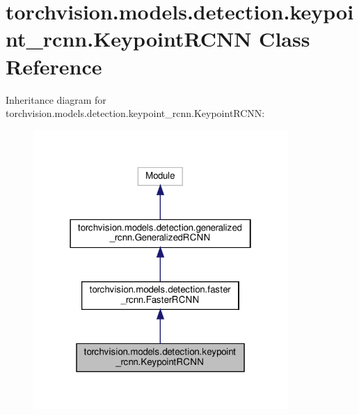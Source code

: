 \hypertarget{classtorchvision_1_1models_1_1detection_1_1keypoint__rcnn_1_1KeypointRCNN}{}\section{torchvision.\+models.\+detection.\+keypoint\+\_\+rcnn.\+Keypoint\+R\+C\+NN Class Reference}
\label{classtorchvision_1_1models_1_1detection_1_1keypoint__rcnn_1_1KeypointRCNN}


Inheritance diagram for torchvision.\+models.\+detection.\+keypoint\+\_\+rcnn.\+Keypoint\+R\+C\+NN\+:
\nopagebreak
\begin{figure}[H]
\begin{center}
\leavevmode
\includegraphics[width=274pt]{classtorchvision_1_1models_1_1detection_1_1keypoint__rcnn_1_1KeypointRCNN__inherit__graph}
\end{center}
\end{figure}


